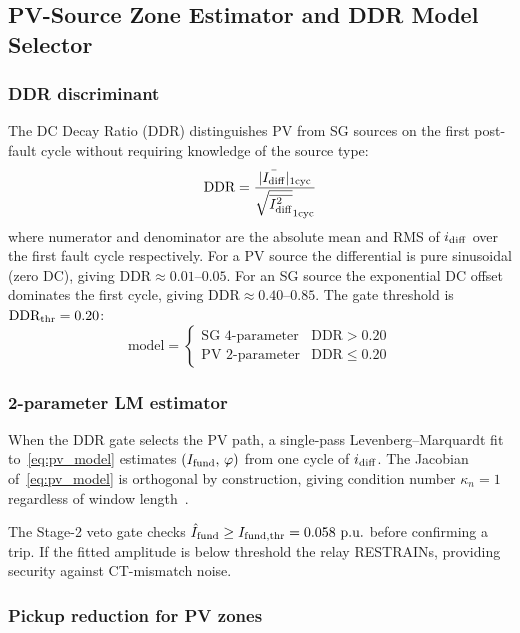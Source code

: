 \documentclass[journal,twoside,10pt]{IEEEtran}
\newcommand{\Idiff}{I_{\mathrm{diff}}}
\newcommand{\kn}{\kappa_n}
\newcommand{\pu}{\,\text{p.u.}}
\begin{document}
\subsection{PV-Source Zone Estimator and DDR Model Selector}
\label{sec:pv}

\subsubsection{DDR discriminant}

The DC Decay Ratio (DDR) distinguishes PV from SG sources on the first
post-fault cycle without requiring knowledge of the source type:
\begin{equation}
  \text{DDR} = \frac{|\bar{\Idiff}|_{\rm 1cyc}}{\sqrt{\overline{\Idiff^2}}_{\rm 1cyc}}
  \label{eq:ddr}
\end{equation}
where numerator and denominator are the absolute mean and RMS of $i_{\rm diff}$
over the first fault cycle respectively.
For a PV source the differential is pure sinusoidal (zero DC), giving
$\text{DDR} \approx 0.01$--$0.05$.
For an SG source the exponential DC offset dominates the first cycle, giving
$\text{DDR} \approx 0.40$--$0.85$.
The gate threshold is $\text{DDR}_{\rm thr} = 0.20$:
\begin{equation}
  \text{model} =
  \begin{cases}
    \text{SG 4-parameter} & \text{DDR} > 0.20 \\
    \text{PV 2-parameter} & \text{DDR} \leq 0.20
  \end{cases}
  \label{eq:selector}
\end{equation}

\subsubsection{2-parameter LM estimator}

When the DDR gate selects the PV path, a single-pass Levenberg--Marquardt
fit to~\eqref{eq:pv_model} estimates $(I_{\rm fund},\,\varphi)$ from one
cycle of $i_{\rm diff}$.  The Jacobian of~\eqref{eq:pv_model} is orthogonal
by construction, giving condition number $\kn = 1$ regardless of window
length~\cite{SAMBP_TR62}.

The Stage-2 veto gate checks $\hat{I}_{\rm fund} \geq I_{\rm fund,thr} = 0.058\,\pu$
before confirming a trip.  If the fitted amplitude is below threshold the
relay RESTRAINs, providing security against CT-mismatch noise.

\subsubsection{Pickup reduction for PV zones}
\end{document}
